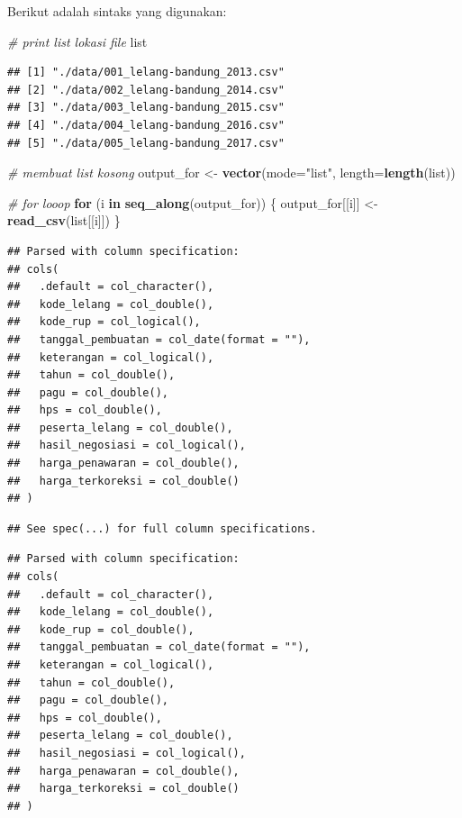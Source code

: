 \documentclass[]{book}
\newenvironment{Shaded}{\begin{snugshade}}{\end{snugshade}}
\newcommand{\KeywordTok}[1]{\textcolor[rgb]{0.13,0.29,0.53}{\textbf{#1}}}
\newcommand{\DataTypeTok}[1]{\textcolor[rgb]{0.13,0.29,0.53}{#1}}
\newcommand{\StringTok}[1]{\textcolor[rgb]{0.31,0.60,0.02}{#1}}
\newcommand{\CommentTok}[1]{\textcolor[rgb]{0.56,0.35,0.01}{\textit{#1}}}
\newcommand{\ControlFlowTok}[1]{\textcolor[rgb]{0.13,0.29,0.53}{\textbf{#1}}}
\newcommand{\NormalTok}[1]{#1}
\begin{document}
Berikut adalah sintaks yang digunakan:

\begin{Shaded}
\begin{Highlighting}[]
\CommentTok{# print list lokasi file}
\NormalTok{list}
\end{Highlighting}
\end{Shaded}

\begin{verbatim}
## [1] "./data/001_lelang-bandung_2013.csv"
## [2] "./data/002_lelang-bandung_2014.csv"
## [3] "./data/003_lelang-bandung_2015.csv"
## [4] "./data/004_lelang-bandung_2016.csv"
## [5] "./data/005_lelang-bandung_2017.csv"
\end{verbatim}

\begin{Shaded}
\begin{Highlighting}[]
\CommentTok{# membuat list kosong}
\NormalTok{output_for <-}\StringTok{ }\KeywordTok{vector}\NormalTok{(}\DataTypeTok{mode=}\StringTok{"list"}\NormalTok{, }\DataTypeTok{length=}\KeywordTok{length}\NormalTok{(list))}

\CommentTok{# for looop}
\ControlFlowTok{for}\NormalTok{ (i }\ControlFlowTok{in} \KeywordTok{seq_along}\NormalTok{(output_for)) \{}
\NormalTok{  output_for[[i]] <-}\StringTok{ }\KeywordTok{read_csv}\NormalTok{(list[[i]])}
\NormalTok{\}}
\end{Highlighting}
\end{Shaded}

\begin{verbatim}
## Parsed with column specification:
## cols(
##   .default = col_character(),
##   kode_lelang = col_double(),
##   kode_rup = col_logical(),
##   tanggal_pembuatan = col_date(format = ""),
##   keterangan = col_logical(),
##   tahun = col_double(),
##   pagu = col_double(),
##   hps = col_double(),
##   peserta_lelang = col_double(),
##   hasil_negosiasi = col_logical(),
##   harga_penawaran = col_double(),
##   harga_terkoreksi = col_double()
## )
\end{verbatim}

\begin{verbatim}
## See spec(...) for full column specifications.
\end{verbatim}

\begin{verbatim}
## Parsed with column specification:
## cols(
##   .default = col_character(),
##   kode_lelang = col_double(),
##   kode_rup = col_double(),
##   tanggal_pembuatan = col_date(format = ""),
##   keterangan = col_logical(),
##   tahun = col_double(),
##   pagu = col_double(),
##   hps = col_double(),
##   peserta_lelang = col_double(),
##   hasil_negosiasi = col_logical(),
##   harga_penawaran = col_double(),
##   harga_terkoreksi = col_double()
## )
\end{verbatim}
\end{document}
